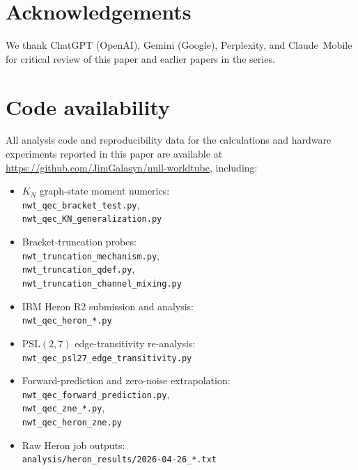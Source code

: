 \documentclass[11pt]{article}
\begin{document}
\section*{Acknowledgements}

We thank ChatGPT (OpenAI), Gemini (Google), Perplexity, and
Claude~Mobile for critical review of this paper and earlier papers
in the series.

\section*{Code availability}

All analysis code and reproducibility data for the calculations and
hardware experiments reported in this paper are available at
\url{https://github.com/JimGalasyn/null-worldtube}, including:
\begin{itemize}
\item $K_N$ graph-state moment numerics: \\
  \texttt{nwt\_qec\_bracket\_test.py}, \\
  \texttt{nwt\_qec\_KN\_generalization.py}
\item Bracket-truncation probes: \\
  \texttt{nwt\_truncation\_mechanism.py}, \\
  \texttt{nwt\_truncation\_qdef.py}, \\
  \texttt{nwt\_truncation\_channel\_mixing.py}
\item IBM Heron R2 submission and analysis: \\
  \texttt{nwt\_qec\_heron\_*.py}
\item $\mathrm{PSL}(2,7)$ edge-transitivity re-analysis: \\
  \texttt{nwt\_qec\_psl27\_edge\_transitivity.py}
\item Forward-prediction and zero-noise extrapolation: \\
  \texttt{nwt\_qec\_forward\_prediction.py}, \\
  \texttt{nwt\_qec\_zne\_*.py}, \\
  \texttt{nwt\_qec\_heron\_zne.py}
\item Raw Heron job outputs: \\
  \texttt{analysis/heron\_results/2026-04-26\_*.txt}
\end{itemize}
\end{document}
